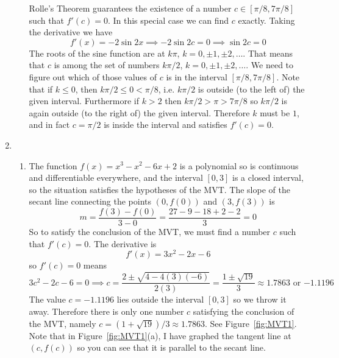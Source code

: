 \documentclass{article}
\begin{document}
\begin{enumerate}
\begin{enumerate}
    Rolle's Theorem guarantees the existence of a number $c\in[\pi/8,7\pi/8]$
    such that $f'(c)=0$.  In this special case we can find $c$ exactly.  
    Taking the derivative we have
    \begin{equation*}
      f'(x)=-2\sin 2x \implies -2\sin 2c = 0 \implies \sin 2c = 0
    \end{equation*}
    The roots of the sine function are at $k\pi$, $k=0,\pm 1, \pm 2, \ldots$.
    That means that $c$ is among the set of numbers
    $k\pi/2$, $k=0,\pm 1, \pm 2, \ldots$.  We need to figure out which of those
    values of $c$ is in the interval $[\pi/8,7\pi/8]$.  Note that if $k\le 0$,
    then $k\pi/2\le 0<\pi/8$, i.e. $k\pi/2$ is outside (to the left of) the
    given interval.  Furthermore if $k>2$ then $k\pi/2>\pi>7\pi/8$ so $k\pi/2$
    is again outside (to the right of) the given interval.  Therefore $k$ must
    be $1$, and in fact $c=\pi/2$ is inside the interval and satisfies 
    $f'(c)=0$.
  \end{enumerate}
\item %
  \begin{enumerate}
  \item\label{prob:MVT1} %
    The function $f(x)=x^3-x^2-6x+2$ is a polynomial so is continuous and
    differentiable everywhere, and the interval $[0,3]$ is a closed interval,
    so the situation satisfies the hypotheses of the MVT.  The slope of the
    secant line connecting the points $(0,f(0))$ and $(3,f(3))$ is
    \begin{equation*}
      m = \frac{f(3)-f(0)}{3-0} = \frac{27-9-18+2-2}{3}=0
    \end{equation*}
    So to satisfy the conclusion of the MVT, we must find a number $c$ such
    that $f'(c)=0$.  The derivative is
    \begin{equation*}
      f'(x)=3x^2-2x-6
    \end{equation*}
    so $f'(c)=0$ means
    \begin{equation*}
      3c^2-2c-6=0 \implies c=\frac{2\pm \sqrt{4-4(3)(-6)}}{2(3)}
      = \frac{1\pm \sqrt{19}}{3} \approx \mbox{$1.7863$ or $-1.1196$}
    \end{equation*}
    The value $c=-1.1196$ lies outside the interval $[0,3]$ so we throw it away.
    Therefore there is only one number $c$ satisfying the conclusion of the
    MVT, namely $c=(1+\sqrt{19})/3\approx 1.7863$.  
    See Figure~\ref{fig:MVT1}.  Note that in 
    Figure~\ref{fig:MVT1}(a), I have graphed the tangent line at $(c,f(c))$ 
    so you can see that it is parallel to the secant line.

\end{enumerate}
\end{enumerate}
\end{document}
